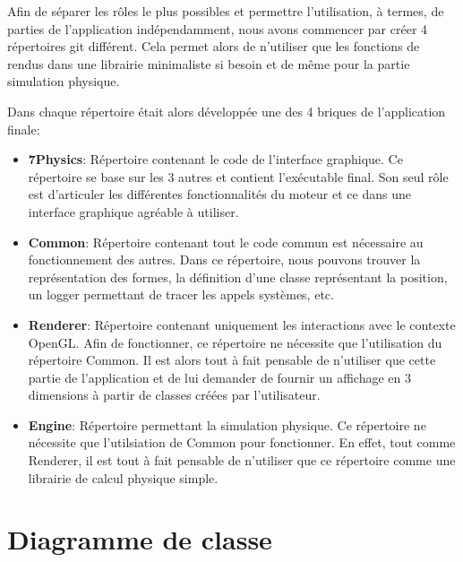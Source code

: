 \documentclass[11pt]{report}
\begin{document}
Afin de séparer les rôles le plus possibles et permettre l'utilisation, à termes, de parties de l'application
indépendamment, nous avons commencer par créer 4 répertoires git différent. Cela permet alors de n'utiliser que
les fonctions de rendus dans une librairie minimaliste si besoin et de même pour la partie simulation physique.\newline

Dans chaque répertoire était alors développée une des 4 briques de l'application finale:\newline

\begin{itemize}
  \item \textbf{7Physics}: Répertoire contenant le code de l'interface graphique. Ce répertoire se base sur les 3 autres
        et contient l'exécutable final. Son seul rôle est d'articuler les différentes fonctionnalités du moteur et ce
        dans une interface graphique agréable à utiliser.\newline
  \item\textbf{Common}: Répertoire contenant tout le code commun est nécessaire au fonctionnement des autres. Dans ce
        répertoire, nous pouvons trouver la représentation des formes, la définition d'une classe représentant la position,
        un logger permettant de tracer les appels systèmes, etc.\newline
  \item \textbf{Renderer}: Répertoire contenant uniquement les interactions avec le contexte OpenGL. Afin de fonctionner,
        ce répertoire ne nécessite que l'utilisation du répertoire Common. Il est alors tout à fait pensable de n'utiliser
        que cette partie de l'application et de lui demander de fournir un affichage en 3 dimensions à partir de classes
        créées par l'utilisateur.\newline
  \item \textbf{Engine}: Répertoire permettant la simulation physique. Ce répertoire ne nécessite que l'utilsiation
        de Common pour fonctionner. En effet, tout comme Renderer, il est tout à fait pensable de n'utiliser que ce répertoire
        comme une librairie de calcul physique simple.\newline
\end{itemize}

\chapter{Diagramme de classe}
\end{document}
